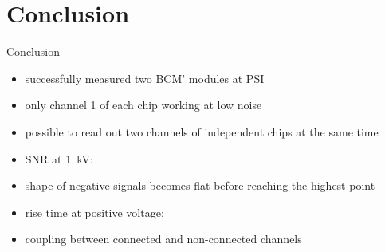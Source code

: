 \section{Conclusion}
\begin{frame}{Conclusion}

	\begin{minipage}[c][.6\textheight]{\textwidth}
		\begin{itemize}\itemfill
			\item successfully measured two BCM' modules at PSI
			\item only channel 1 of each chip working at low noise
			\item possible to read out two channels of independent chips at the same time
			\item SNR at \SI{1}{\kilo\volt}:
			\item shape of negative signals becomes flat before reaching the highest point
			\item rise time at positive voltage: 
			\item coupling between connected and non-connected channels
		\end{itemize}
	\end{minipage}
	
\end{frame}
